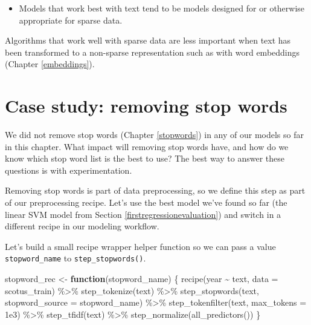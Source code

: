 \documentclass[
]{krantz}
\makeatletter
\newenvironment{Shaded}{\begin{snugshade}}{\end{snugshade}}
\newcommand{\AttributeTok}[1]{\textcolor[rgb]{0.77,0.63,0.00}{#1}}
\newcommand{\ControlFlowTok}[1]{\textcolor[rgb]{0.13,0.29,0.53}{\textbf{#1}}}
\newcommand{\FloatTok}[1]{\textcolor[rgb]{0.00,0.00,0.81}{#1}}
\newcommand{\FunctionTok}[1]{\textcolor[rgb]{0.00,0.00,0.00}{#1}}
\newcommand{\NormalTok}[1]{#1}
\newcommand{\OtherTok}[1]{\textcolor[rgb]{0.56,0.35,0.01}{#1}}
\newcommand{\SpecialCharTok}[1]{\textcolor[rgb]{0.00,0.00,0.00}{#1}}
\newenvironment{kframe}{%
\medskip{}
\setlength{\fboxsep}{.8em}
 \def\at@end@of@kframe{}%
 \ifinner\ifhmode%
  \def\at@end@of@kframe{\end{minipage}}%
  \begin{minipage}{\columnwidth}%
 \fi\fi%
 \def\FrameCommand##1{\hskip\@totalleftmargin \hskip-\fboxsep
 \colorbox{shadecolor}{##1}\hskip-\fboxsep
     \hskip-\linewidth \hskip-\@totalleftmargin \hskip\columnwidth}%
 \MakeFramed {\advance\hsize-\width
   \@totalleftmargin\z@ \linewidth\hsize
   \@setminipage}}%
 {\par\unskip\endMakeFramed%
 \at@end@of@kframe}
\renewenvironment{Shaded}{\begin{kframe}}{\end{kframe}}
\newenvironment{rmdblock}[1]
  {\begin{shaded*}
  \begin{itemize}[left = -1cm, labelsep = 1cm]
  \renewcommand{\labelitemi}{
    \raisebox{-.7\height}[0pt][0pt]{
      {\setkeys{Gin}{width=3em,keepaspectratio}\texttt{[image: images/\#1]}}
    }
  }
 
  \item
  }
  {
  \end{itemize}
  \end{shaded*}
  }
\newenvironment{rmdnote}
  {\begin{rmdblock}{note}}
  {\end{rmdblock}}
\makeatother
\begin{document}
\begin{rmdnote}
Models that work best with text tend to be models designed for or
otherwise appropriate for sparse data.
\end{rmdnote}

Algorithms that work well with sparse data are less important when text has been transformed to a non-sparse representation such as with word embeddings (Chapter \ref{embeddings}).

\hypertarget{casestudystopwords}{%
\section{Case study: removing stop words}\label{casestudystopwords}}

We did not remove stop words (Chapter \ref{stopwords}) in any of our models so far in this chapter. What impact will removing stop words have, and how do we know which stop word list is the best to use? The best way to answer these questions is with experimentation.

Removing stop words is part of data preprocessing, so we define this step as part of our preprocessing recipe. Let's use the best model we've found so far (the linear SVM model from Section \ref{firstregressionevaluation}) and switch in a different recipe in our modeling workflow.

Let's build a small recipe wrapper helper function so we can pass a value \texttt{stopword\_name} to \texttt{step\_stopwords()}.

\begin{Shaded}
\begin{Highlighting}[]
\NormalTok{stopword\_rec }\OtherTok{\textless{}{-}} \ControlFlowTok{function}\NormalTok{(stopword\_name) \{}
  \FunctionTok{recipe}\NormalTok{(year }\SpecialCharTok{\textasciitilde{}}\NormalTok{ text, }\AttributeTok{data =}\NormalTok{ scotus\_train) }\SpecialCharTok{\%\textgreater{}\%}
    \FunctionTok{step\_tokenize}\NormalTok{(text) }\SpecialCharTok{\%\textgreater{}\%}
    \FunctionTok{step\_stopwords}\NormalTok{(text, }\AttributeTok{stopword\_source =}\NormalTok{ stopword\_name) }\SpecialCharTok{\%\textgreater{}\%}
    \FunctionTok{step\_tokenfilter}\NormalTok{(text, }\AttributeTok{max\_tokens =} \FloatTok{1e3}\NormalTok{) }\SpecialCharTok{\%\textgreater{}\%}
    \FunctionTok{step\_tfidf}\NormalTok{(text) }\SpecialCharTok{\%\textgreater{}\%}
    \FunctionTok{step\_normalize}\NormalTok{(}\FunctionTok{all\_predictors}\NormalTok{())}
\NormalTok{\}}
\end{Highlighting}
\end{Shaded}
\end{document}
